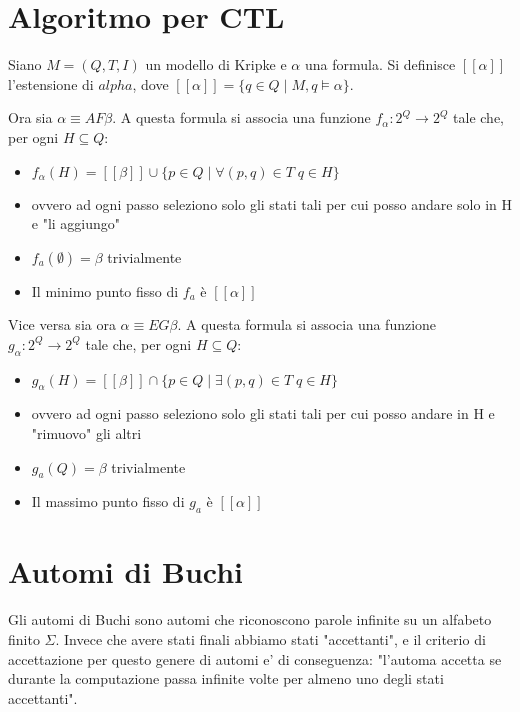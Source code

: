 \section{Algoritmo per CTL}


Siano $M = (Q, T, I)$ un modello di Kripke e $\alpha$ una formula. Si definisce $[[\alpha]]$ l'estensione di $alpha$, dove $[[\alpha]] = \{q \in Q \; | \; M,q \models \alpha\}$.

Ora sia $\alpha \equiv AF\beta$. A questa formula si associa una funzione $f_\alpha : 2^Q \rightarrow 2^Q$ tale che, per ogni $H \subseteq Q$:

\begin{itemize}
  \item $f_\alpha(H) = [[\beta]] \cup \{p \in Q \; | \; \forall (p, q) \in T \; q \in H\}$
  \item ovvero ad ogni passo seleziono solo gli stati tali per cui posso andare solo in H e "li aggiungo"
  \item $f_a(\emptyset) = \beta$ trivialmente
  \item Il minimo punto fisso di $f_a$ \`e $[[\alpha]]$
\end{itemize}

Vice versa sia ora $\alpha \equiv EG\beta$. A questa formula si associa una funzione $g_\alpha : 2^Q \rightarrow 2^Q$ tale che, per ogni $H \subseteq Q$:

\begin{itemize}
  \item $g_\alpha(H) = [[\beta]] \cap \{p \in Q \; | \; \exists (p, q) \in T \; q \in H\}$
  \item ovvero ad ogni passo seleziono solo gli stati tali per cui posso andare in H e "rimuovo" gli altri
  \item $g_a(Q) = \beta$ trivialmente
  \item Il massimo punto fisso di $g_a$ \`e $[[\alpha]]$
\end{itemize}

\section{Automi di Buchi}

Gli automi di Buchi sono automi che riconoscono parole infinite su un alfabeto finito $\Sigma$.
Invece che avere stati finali abbiamo stati "accettanti", e il criterio di accettazione per questo genere di automi e' di conseguenza: "l'automa accetta se durante la computazione passa infinite volte per almeno uno degli stati accettanti".

